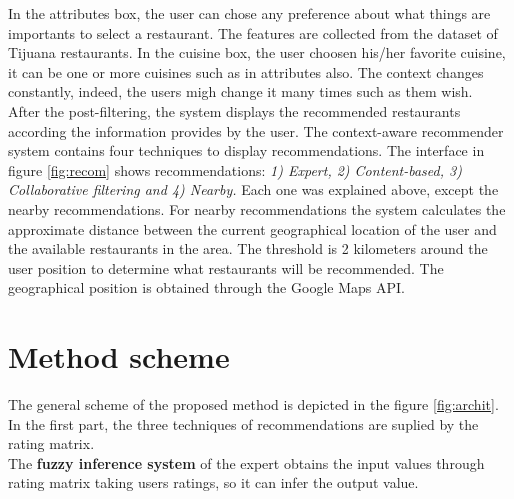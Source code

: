 In the attributes box, the user can chose any preference about what
things are importants to select a restaurant. The features are
collected from the dataset of Tijuana restaurants. In the cuisine box,
the user choosen his/her favorite cuisine, it can be one or more
cuisines such as in attributes  also.
The context changes constantly, indeed, the users migh change 
it many times such as them wish.\\ 
After the post-filtering, the system displays the  recommended
restaurants according the information provides by the user. The
context-aware recommender system contains four techniques to display
recommendations. The interface in figure \ref{fig:recom} shows
recommendations: \textit{1) Expert, 2) Content-based, 3) Collaborative
filtering and 4) Nearby.} Each one was explained above, except the
nearby recommendations. For nearby recommendations the system
calculates the approximate distance between the current geographical
location of the user and the available restaurants in the area.  The
threshold is 2 kilometers around the user position to determine what
restaurants will be recommended. The geographical position is
obtained through the Google Maps API.
\section{Method scheme} 

The general scheme of the proposed method is depicted in the figure
\ref{fig:archit}. In the first part, the three techniques of
recommendations are suplied by the rating matrix. \\ The \textbf{fuzzy
inference system} of the expert  obtains the input values  through
rating matrix taking users ratings, so it can infer the output value.

